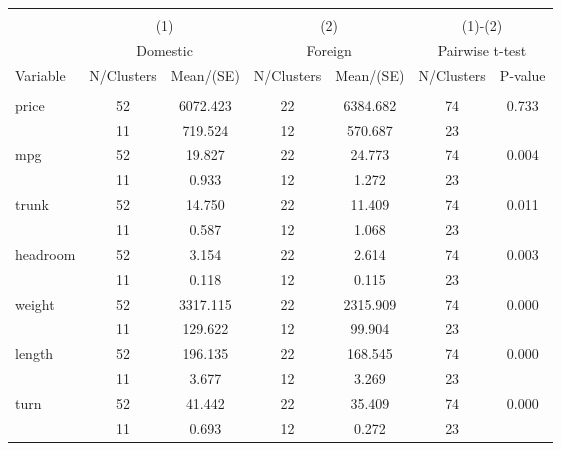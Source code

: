 
\begin{tabular}{@{\extracolsep{5pt}}lcccccc}
\\[-1.8ex]\hline \hline \\[-1.8ex]
 & \multicolumn{2}{c}{(1)}  & \multicolumn{2}{c}{(2)}  & \multicolumn{2}{c}{(1)-(2)} \\
 & \multicolumn{2}{c}{Domestic}  & \multicolumn{2}{c}{Foreign}  & \multicolumn{2}{c}{Pairwise t-test}  \\
Variable & N/Clusters & Mean/(SE) & N/Clusters & Mean/(SE) & N/Clusters & P-value \\ \hline \\[-1.8ex] 
price   & 52    &  6072.423    & 22    &  6384.682    & 74    &     0.733   \\
 & 11  &   719.524  & 12  &   570.687  & 23  &   \\
mpg   & 52    &    19.827    & 22    &    24.773    & 74    &     0.004   \\
 & 11  &     0.933  & 12  &     1.272  & 23  &   \\
trunk   & 52    &    14.750    & 22    &    11.409    & 74    &     0.011   \\
 & 11  &     0.587  & 12  &     1.068  & 23  &   \\
headroom   & 52    &     3.154    & 22    &     2.614    & 74    &     0.003   \\
 & 11  &     0.118  & 12  &     0.115  & 23  &   \\
weight   & 52    &  3317.115    & 22    &  2315.909    & 74    &     0.000   \\
 & 11  &   129.622  & 12  &    99.904  & 23  &   \\
length   & 52    &   196.135    & 22    &   168.545    & 74    &     0.000   \\
 & 11  &     3.677  & 12  &     3.269  & 23  &   \\
turn   & 52    &    41.442    & 22    &    35.409    & 74    &     0.000   \\
 & 11  &     0.693  & 12  &     0.272  & 23  &   \\

\end{tabular}

